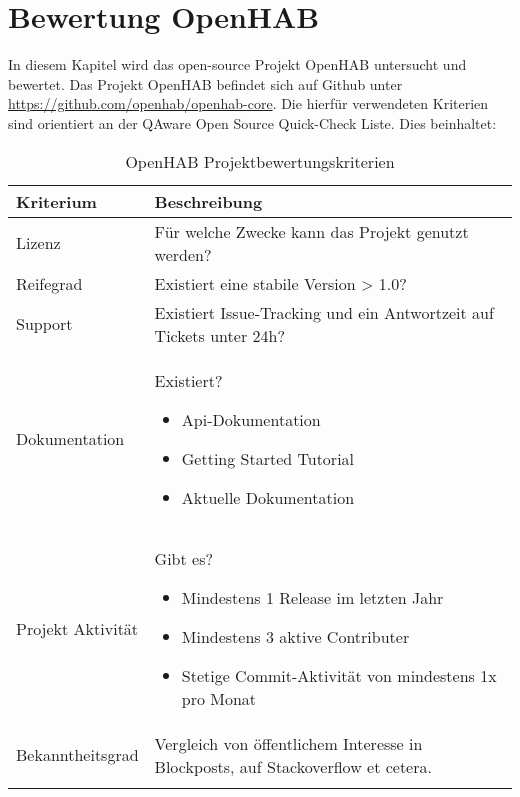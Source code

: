 \section{Bewertung OpenHAB}
In diesem Kapitel wird das open-source Projekt OpenHAB untersucht und bewertet. Das Projekt OpenHAB befindet sich auf Github unter \url{https://github.com/openhab/openhab-core}. Die hierfür verwendeten Kriterien sind orientiert an der QAware Open Source Quick-Check Liste.
Dies beinhaltet:
\begin{longtable}{| p{3cm} | p{12cm}|}
	\hline
	\textbf{Kriterium} & \textbf{Beschreibung} \\
	\hline \hline
	\centering Lizenz & Für welche Zwecke kann das Projekt genutzt werden? \\
	\hline
	\centering Reifegrad & Existiert eine stabile Version > 1.0?  \\
	\hline
	\centering Support & Existiert Issue-Tracking und ein Antwortzeit auf Tickets unter 24h? \\
	\hline
	\centering Dokumentation & Existiert?
	\begin{itemize}
		\item Api-Dokumentation
		\item Getting Started Tutorial
		\item Aktuelle Dokumentation
	\end{itemize} \\
	\hline
	\centering Projekt Aktivität & Gibt es?
	\begin{itemize}
		\item Mindestens 1 Release im letzten Jahr
		\item Mindestens 3 aktive Contributer
		\item Stetige Commit-Aktivität von mindestens 1x pro Monat
	\end{itemize}\\
	\hline
	\centering Bekanntheitsgrad & Vergleich von öffentlichem Interesse in Blockposts, auf Stackoverflow et cetera. \\
	\hline
	\caption{OpenHAB Projektbewertungskriterien}
	\label{table:openhub-judgement-kriteria}
\end{longtable}



